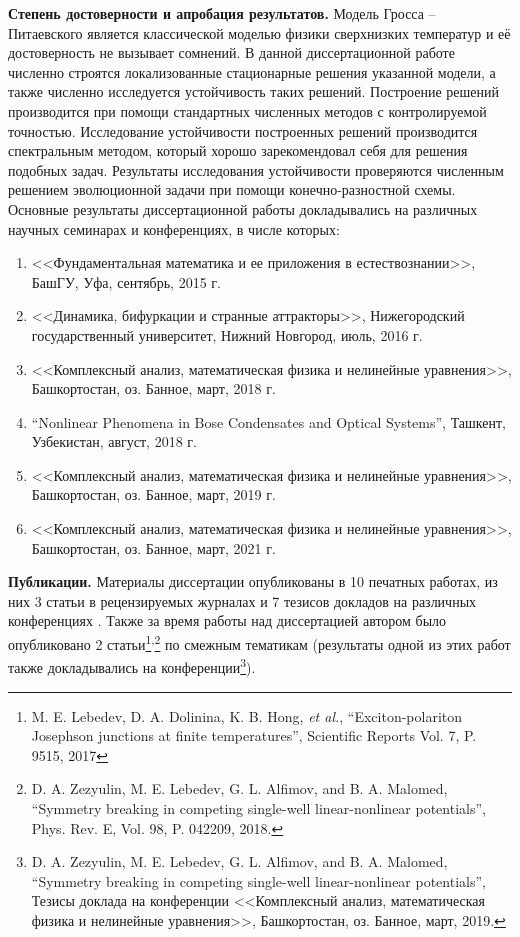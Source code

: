 \documentclass[candidate, href, colorlinks]{disser}
\begin{document}
\textbf{Степень достоверности и апробация результатов.}
Модель Гросса -- Питаевского является классической моделью физики сверхнизких температур и её достоверность не вызывает сомнений.
В данной диссертационной работе численно строятся локализованные стационарные решения указанной модели, а также численно исследуется устойчивость таких решений.
Построение решений производится при помощи стандартных численных методов с контролируемой точностью.
Исследование устойчивости построенных решений производится спектральным методом, который хорошо зарекомендовал себя для решения подобных задач.
Результаты исследования устойчивости проверяются численным решением эволюционной задачи при помощи конечно-разностной схемы.
Основные результаты диссертационной работы докладывались на различных научных семинарах и конференциях, в числе которых:
\begin{enumerate}
	\item <<Фундаментальная математика и ее приложения в естествознании>>, БашГУ, Уфа, сентябрь, 2015 г.
	\item <<Динамика, бифуркации и странные аттракторы>>, Нижегородский государственный университет, Нижний Новгород, июль, 2016 г.
	\item <<Комплексный анализ, математическая физика и нелинейные уравнения>>, Башкортостан, оз. Банное, март, 2018 г.
	\item ``Nonlinear Phenomena in Bose Condensates and Optical Systems'', Ташкент, Узбекистан, август, 2018 г.
	\item <<Комплексный анализ, математическая физика и нелинейные уравнения>>, Башкортостан, оз. Банное, март, 2019 г.
	\item <<Комплексный анализ, математическая физика и нелинейные уравнения>>, Башкортостан, оз. Банное, март, 2021 г.
\end{enumerate}

\textbf{Публикации.}
Материалы диссертации опубликованы в 10 печатных работах, из них 3 статьи в рецензируемых журналах \cite{AlfimovLebedev, LebedevAlfimovMalomed, AlfimovGegelLebedevMalomedZezyulin} и 7 тезисов докладов на различных конференциях \cite{Ufa2015, NizhniNovgorod2016, Bannoe2018, Tashkent2018, Bannoe2019, Bannoe2021}.
Также за время работы над диссертацией автором было опубликовано 2 статьи\footnote{M. E. Lebedev, D. A. Dolinina, K. B. Hong, {\it et al.}, ``Exciton-polariton Josephson junctions at finite temperatures'', Scientific Reports Vol. 7, P. 9515, 2017}\textsuperscript{,}\footnote{D. A. Zezyulin, M. E. Lebedev, G. L. Alfimov, and B. A. Malomed, ``Symmetry breaking in competing single-well linear-nonlinear potentials'', Phys. Rev. E, Vol. 98, P. 042209, 2018.} по смежным тематикам (результаты одной из этих работ также докладывались на конференции\footnote{D. A. Zezyulin, M. E. Lebedev, G. L. Alfimov, and B. A. Malomed, ``Symmetry breaking in competing single-well linear-nonlinear potentials'', Тезисы доклада на конференции <<Комплексный анализ, математическая физика и нелинейные уравнения>>, Башкортостан, оз. Банное, март, 2019.}).
\end{document}
